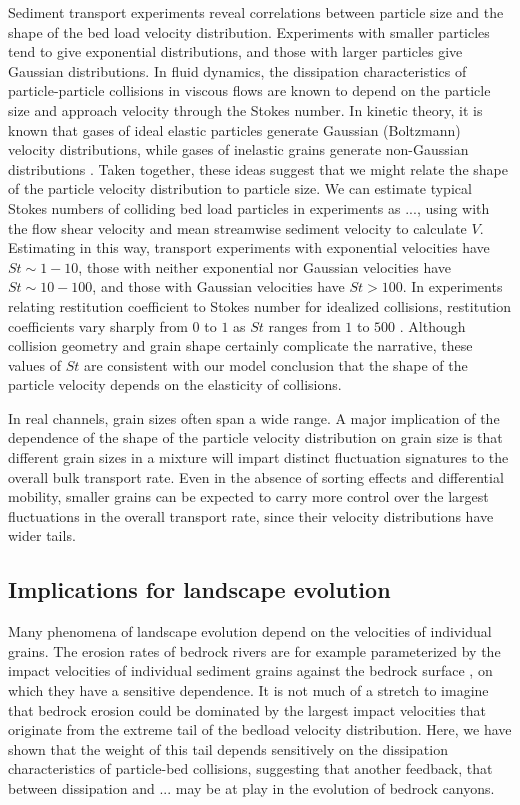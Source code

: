 Sediment transport experiments reveal correlations between particle size and the shape of the bed load velocity distribution.
Experiments with smaller particles tend to give exponential distributions, and those with larger particles give Gaussian distributions.
In fluid dynamics, the dissipation characteristics of particle-particle collisions in viscous flows are known to depend on the particle size and approach velocity through the Stokes number. 
In kinetic theory, it is known that gases of ideal elastic particles generate Gaussian (Boltzmann) velocity distributions, while gases of inelastic grains generate non-Gaussian distributions \citep{Chapman1970,Brilliantov2004}.
Taken together, these ideas suggest that we might relate the shape of the particle velocity distribution to particle size.
We can estimate typical Stokes numbers of colliding bed load particles in experiments as $...$, using with the flow shear velocity and mean streamwise sediment velocity to calculate $V$. Estimating in this way, transport experiments with exponential velocities have $St \sim 1-10$, those with neither exponential nor Gaussian velocities have $St \sim 10-100$, and those with Gaussian velocities have $St > 100$.
In experiments relating restitution coefficient to Stokes number for idealized collisions, restitution coefficients vary sharply from $0$ to $1$ as $St$ ranges from $1$ to $500$ \cite{Marshall2011,Joseph2001,Yang2006}.
Although collision geometry and grain shape certainly complicate the narrative, these values of $St$ are consistent with our model conclusion that the shape of the particle velocity depends on the elasticity of collisions.

In real channels, grain sizes often span a wide range. A major implication of the dependence of the shape of the particle velocity distribution on grain size is that different grain sizes in a mixture will impart distinct fluctuation signatures to the overall bulk transport rate. Even in the absence of sorting effects and differential mobility, smaller grains can be expected to carry more control over the largest fluctuations in the overall transport rate, since their velocity distributions have wider tails. 

\subsection{Implications for landscape evolution}

Many phenomena of landscape evolution depend on the velocities of individual grains.
The erosion rates of bedrock rivers are for example parameterized by the impact velocities of individual sediment grains against the bedrock surface \citep{Sklar2004,Li2020,Turowski2021}, on which they have a sensitive dependence.
It is not much of a stretch to imagine that bedrock erosion could be dominated by the largest impact velocities that originate from the extreme tail of the bedload velocity distribution. Here, we have shown that the weight of this tail depends sensitively on the dissipation characteristics of particle-bed collisions, suggesting that another feedback, that between dissipation and ... may be at play in the evolution of bedrock canyons.

